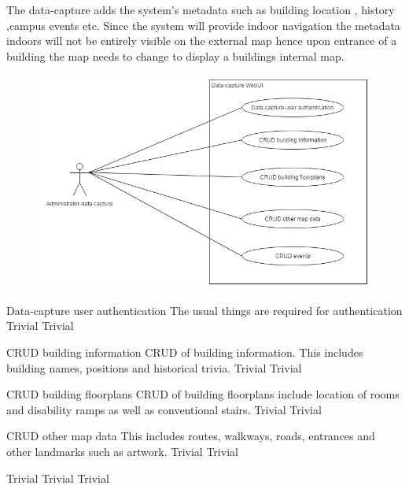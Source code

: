 The data-capture adds the system's metadata such as building location , history ,campus events etc. Since the system will provide indoor navigation the metadata indoors will not be entirely visible on the external map hence upon entrance of a building the map needs to change to display a buildings internal map.
\bigskip
\begin{figure} 
  \includegraphics[width=\textwidth]{diagrams/Specific_Requirements/data_capture_WebUI.png}
\end{figure}
\FuncReq
{Data-capture user authentication}
{The usual things are required for authentication}
{Trivial}
{Trivial}

\FuncReq
{CRUD building information}
{CRUD of building information. This includes building names, positions and historical trivia.}
{Trivial}
{Trivial}

\FuncReq
{CRUD building floorplans}
{CRUD of building floorplans include location of rooms and disability ramps as well as conventional stairs.}
{Trivial}
{Trivial}

\FuncReq
{CRUD other map data}
{This includes routes, walkways, roads, entrances and other landmarks such as artwork.}
{Trivial}
{Trivial}
 
{Trivial}
{Trivial}
{Trivial}
